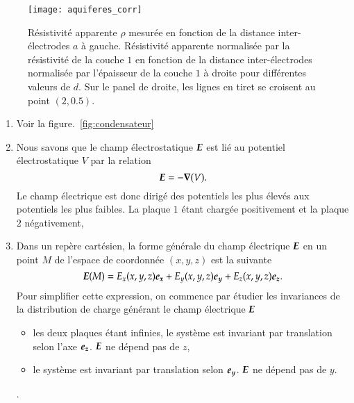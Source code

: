 \begin{figure}[h!]
	\centering
	\texttt{[image: aquiferes\_corr]}
	\caption{Résistivité apparente $\rho$ mesurée en fonction de la distance
	         inter-électrodes $a$ à gauche. Résistivité apparente normalisée
	 	 par la résistivité de la couche $1$ en fonction de la distance 
	 	inter-électrodes normalisée par l'épaisseur de la couche $1$
		à droite pour différentes valeurs de $d$. Sur le panel de 
		droite, les lignes en tiret se croisent au point $(2, 0.5)$.}%
	\label{fig:aquiferes_corr}
\end{figure}
\begin{corrige}
\begin{enumerate}
	\item Voir la figure.~\ref{fig:condensateur}
	\item Nous savons que le champ électrostatique $\vece$ est lié au potentiel
	      électrostatique $V$ par la relation
	      \begin{equation*}
		      \vece = - \grad(V).
	      \end{equation*}
	      Le champ électrique est donc dirigé des potentiels les plus élevés 
	      aux potentiels les plus faibles. La plaque $1$ étant chargée positivement
	      et la plaque $2$ négativement, 
      \item Dans un repère cartésien, la forme générale du champ électrique $\vece$ 
	    en un point $M$ de l'espace de coordonnée $(x, y, z)$ est la suivante
	    \begin{equation*}
		    \vece(M) = E_x(x, y, z)\ex + E_y(x, y, z)\ey + E_z(x, y, z)\ez.
	    \end{equation*}
	    Pour simplifier cette expression, on commence par étudier les invariances de la
	    distribution de charge générant le champ électrique $\vece$
	    \begin{itemize}
		    \item les deux plaques étant infinies, le système est invariant
			  par translation selon l'axe $\ez$. $\vece$ ne dépend pas
			  de $z$,
		    \item le système est invariant par translation selon $\ey$.
			  $\vece$ ne dépend pas de $y$.
	   \end{itemize}
	   .


\end{enumerate}
\end{corrige}
